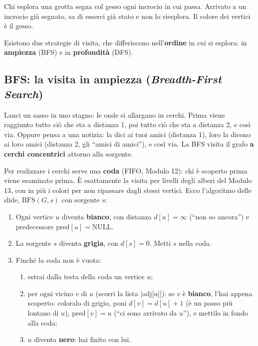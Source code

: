 \begin{analogia}
Chi esplora una grotta segna col gesso ogni incrocio in cui passa. Arrivato a un incrocio
già segnato, sa di esserci già stato e non lo riesplora. Il colore dei vertici è il gesso.
\end{analogia}

Esistono due strategie di visita, che differiscono nell'\textbf{ordine} in cui si
esplora: in \textbf{ampiezza} (BFS) e in \textbf{profondità} (DFS).

\subsection*{BFS: la visita in ampiezza (\emph{Breadth-First Search})}

\begin{analogia}
Lanci un sasso in uno stagno: le onde si allargano in cerchi. Prima viene raggiunto
tutto ciò che sta a distanza 1, poi tutto ciò che sta a distanza 2, e così via. Oppure
pensa a una notizia: la dici ai tuoi amici (distanza 1), loro la dicono ai loro amici
(distanza 2, gli ``amici di amici''), e così via. La BFS visita il grafo \textbf{a
cerchi concentrici} attorno alla sorgente.
\end{analogia}

Per realizzare i cerchi serve una \textbf{coda} (FIFO, Modulo 12): chi è scoperto prima
viene esaminato prima. È esattamente la visita per livelli degli alberi del Modulo 13, con
in più i colori per non ripassare dagli stessi vertici. Ecco l'algoritmo delle slide,
$\text{BFS}(G, s)$ con sorgente $s$:

\begin{passopasso}[: BFS(G, s)]
\begin{enumerate}
  \item Ogni vertice $u$ diventa \textbf{bianco}, con distanza $d[u] = \infty$ (``non
        so ancora'') e predecessore $\text{pred}[u] = \text{NULL}$.
  \item La sorgente $s$ diventa \textbf{grigia}, con $d[s] = 0$. Metti $s$ nella coda.
  \item Finché la coda non è vuota:
  \begin{enumerate}
    \item estrai dalla testa della coda un vertice $u$;
    \item per ogni vicino $v$ di $u$ (scorri la lista \cc|adj[u]|): se $v$ è
          \textbf{bianco}, l'hai appena scoperto: coloralo di grigio, poni
          $d[v] = d[u] + 1$ (è un passo più lontano di $u$), $\text{pred}[v] = u$ (``ci
          sono arrivato da $u$''), e mettilo in fondo alla coda;
    \item $u$ diventa \textbf{nero}: hai finito con lui.
  \end{enumerate}
\end{enumerate}
\end{passopasso}

